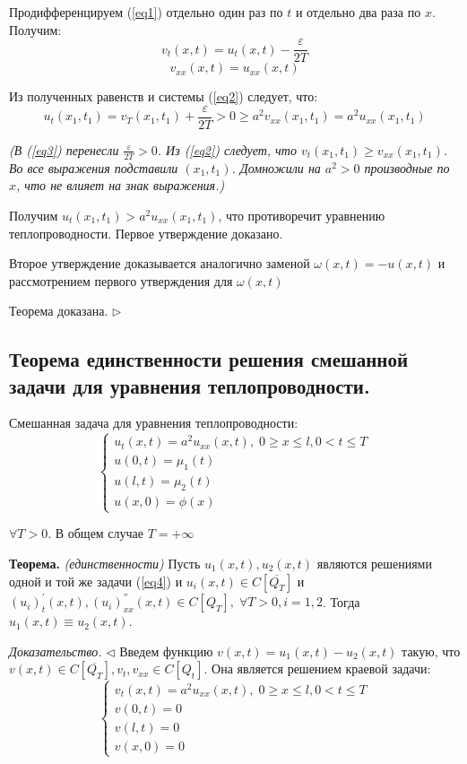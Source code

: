 \documentclass[11pt,a4paper]{article}
\begin{document}
    Продифференцируем (\ref{eq1}) отдельно один раз по $t$ и отдельно два раза по $x$. Получим:
    \begin{equation}
        \label{eq3}
        v_t(x,t) = u_t(x,t) - \frac{\varepsilon}{2T}
    \end{equation}
    $$
    v_{xx}(x,t) = u_{xx}(x,t)
    $$
    
    Из полученных равенств и системы (\ref{eq2}) следует, что:
    $$
    u_t(x_1,t_1) = v_T(x_1,t_1) + \frac{\varepsilon}{2T} > 0 \geqslant a^2v_{xx}(x_1,t_1) = a^2u_{xx}(x_1,t_1)
    $$
    
    \textit{(В (\ref{eq3}) перенесли $\frac{\varepsilon}{2T} > 0$. Из (\ref{eq2}) следует, что $v_t(x_1,t_1) \geq v_{xx}(x_1,t_1)$. Во все выражения подставили $(x_1,t_1)$. Домножили на $a^2 > 0$ производные по $x$, что не влияет на знак выражения.)}
    
    Получим $u_t(x_1,t_1) > a^2u_{xx}(x_1,t_1)$, что противоречит уравнению теплопроводности. Первое утверждение доказано.
    \par
    Второе утверждение доказывается аналогично заменой $\omega(x,t) = -u(x,t)$ и рассмотрением первого утверждения для $\omega(x,t)$
    \par
    Теорема доказана. $\triangleright$
    
    \subsection{Теорема единственности решения смешанной задачи для уравнения теплопроводности.}
    Смешанная задача для уравнения теплопроводности:
    \begin{equation}
      \label{eq4}
      \begin{cases}
          u_t(x,t) = a^2u_{xx}(x,t), \; 0 \geqslant x \leqslant l, 0 < t \leqslant T \\
          u(0, t) = \mu_1(t) \\
          u(l, t) = \mu_2(t) \\
          u(x, 0) = \phi(x)
      \end{cases}
    \end{equation}
   
    $\forall T > 0$. В общем случае $T = +\infty $
    
    \textbf{Теорема.} \textit{(единственности)} Пусть $u_1(x,t),u_2(x,t)$ являются решениями одной и той же задачи (\ref{eq4}) и $u_i(x,t) \in C[\overline{Q_T}]$ и $(u_i)_{t}^{'}(x,t),(u_i)_{xx}^{''}(x,t) \in C[Q_T], \; \forall T > 0, i = 1,2$. Тогда $u_1(x,t) \equiv u_2(x,t)$.
    \par
    \textit{Доказательство.} $\triangleleft$ Введем функцию $v(x,t) = u_1(x,t) - u_2(x,t)$ такую, что $v(x,t) \in C[\overline{Q_T}], v_t, v_{xx} \in C[Q_t]$. Она является решением краевой задачи:
    $$
    \begin{cases}
        v_t(x,t) = a^2u_{xx}(x,t), \; 0 \geqslant x \leqslant l, 0 < t \leqslant T \\
        v(0, t) = 0 \\
        v(l, t) = 0 \\
        v(x, 0) = 0
    \end{cases}
    $$
    
\end{document}
